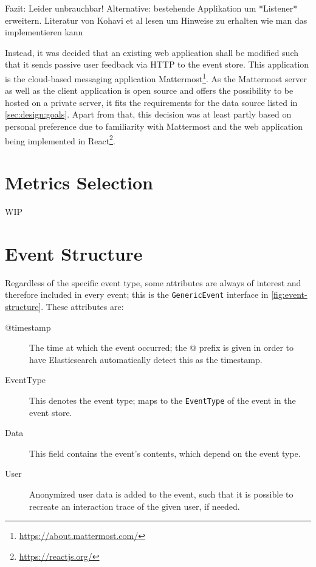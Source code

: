 Fazit: Leider unbrauchbar!
Alternative: bestehende Applikation um *Listener* erweitern. Literatur von Kohavi et al lesen um Hinweise zu erhalten wie man das implementieren kann

Instead, it was decided that an existing web application shall be modified such that it sends passive user feedback via \ac{HTTP} to the event store.
This application is the cloud-based messaging application Mattermost\footnote{\url{https://about.mattermost.com/}}.
As the Mattermost server as well as the client application is open source and offers the possibility to be hosted on a private server, it fits the requirements for the data source listed in \cref{sec:design:goals}.
Apart from that, this decision was at least partly based on personal preference due to familiarity with Mattermost and the web application being implemented in React\footnote{\url{https://reactjs.org/}}.

\section{Metrics Selection}
\label{sec:design:metrics}

WIP
\cite{Kelly:2003:IFI:959258.959260}
\cite{Claypool2001}



\section{Event Structure}
\label{sec:design:event-structure}

Regardless of the specific event type, some attributes are always of interest and therefore included in every event; this is the \texttt{GenericEvent} interface in \cref{fig:event-structure}.
These attributes are:

\begin{description}
\item[@timestamp] The time at which the event occurred; the @ prefix is given in order to have Elasticsearch automatically detect this as the timestamp.
\item[EventType] This denotes the event type; maps to the \texttt{EventType} of the event in the event store.
\item[Data] This field contains the event's contents, which depend on the event type.
\item[User] Anonymized user data is added to the event, such that it is possible to recreate an interaction trace of the given user, if needed.
\end{description}

